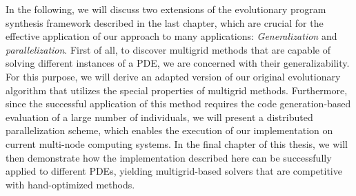 In the following, we will discuss two extensions of the evolutionary program synthesis framework described in the last chapter, which are crucial for the effective application of our approach to many applications: \emph{Generalization} and \emph{parallelization}.  
First of all, to discover multigrid methods that are capable of solving different instances of a PDE, we are concerned with their generalizability.
For this purpose, we will derive an adapted version of our original evolutionary algorithm that utilizes the special properties of multigrid methods.
Furthermore, since the successful application of this method requires the code generation-based evaluation of a large number of individuals, we will present a distributed parallelization scheme, which enables the execution of our implementation on current multi-node computing systems.
In the final chapter of this thesis, we will then demonstrate how the implementation described here can be successfully applied to different PDEs, yielding multigrid-based solvers that are competitive with hand-optimized methods. 

